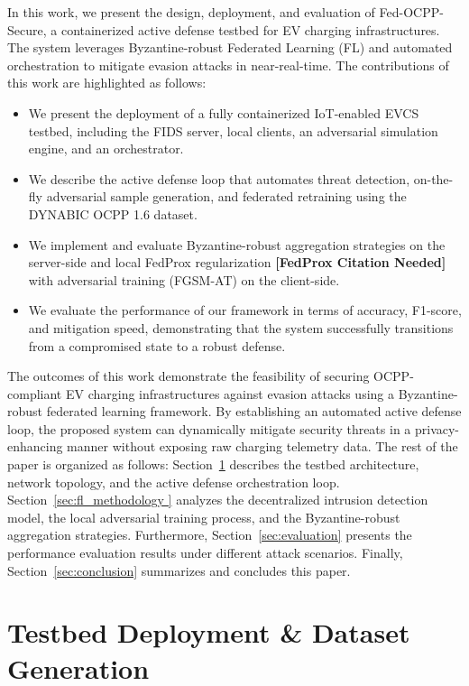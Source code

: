 \documentclass[10pt, a4paper, conference]{IEEEtran}
\begin{document}
In this work, we present the design, deployment, and evaluation of Fed-OCPP-Secure, a containerized active defense testbed for EV charging infrastructures. The system leverages Byzantine-robust Federated Learning (FL) and automated orchestration to mitigate evasion attacks in near-real-time. The contributions of this work are highlighted as follows:
\begin{itemize}
	\item We present the deployment of a fully containerized IoT-enabled EVCS testbed, including the FIDS server, local clients, an adversarial simulation engine, and an orchestrator.
	\item We describe the active defense loop that automates threat detection, on-the-fly adversarial sample generation, and federated retraining using the DYNABIC OCPP 1.6 dataset.
	\item We implement and evaluate Byzantine-robust aggregation strategies on the server-side and local FedProx regularization \textbf{[FedProx Citation Needed]} with adversarial training (FGSM-AT) on the client-side.
    \item We evaluate the performance of our framework in terms of accuracy, F1-score, and mitigation speed, demonstrating that the system successfully transitions from a compromised state to a robust defense.
\end{itemize}

The outcomes of this work demonstrate the feasibility of securing OCPP-compliant EV charging infrastructures against evasion attacks using a Byzantine-robust federated learning framework. By establishing an automated active defense loop, the proposed system can dynamically mitigate security threats in a privacy-enhancing manner without exposing raw charging telemetry data. The rest of the paper is organized as follows:  Section~\ref{sec:testbed} describes the testbed architecture, network topology, and the active defense orchestration loop.  Section~\ref{sec:fl_methodology } analyzes the decentralized intrusion detection model, the local adversarial training process, and the Byzantine-robust aggregation strategies. Furthermore,  Section~\ref{sec:evaluation} presents the performance evaluation results under different attack scenarios. Finally, Section~\ref{sec:conclusion} summarizes and concludes this paper.

\section{Testbed Deployment \& Dataset Generation}\label{sec:testbed}
\end{document}
